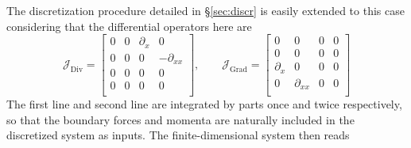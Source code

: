 \documentclass{svjour3}                     %
\newcommand{\secref}[1]{\S\ref{#1}}
\DeclareMathOperator*{\Grad}{Grad}
\DeclareMathOperator*{\Div}{Div}
\begin{document}
The discretization procedure detailed in \secref{sec:discr} is easily extended to this case considering that the differential operators here are 
\[
\bm{\mathcal{J}}_{\Div} = \begin{bmatrix}
0 & 0 & \partial_x & 0 \\
0 & 0 & 0 & -\partial_{xx} \\
0 & 0 & 0 & 0 \\
0 & 0 & 0 & 0 \\
\end{bmatrix}, \qquad 
\bm{\mathcal{J}}_{\Grad} = \begin{bmatrix}
0 & 0 & 0 & 0 \\
0 & 0 & 0 & 0 \\
\partial_x & 0 & 0 & 0 \\
0 & \partial_{xx} & 0 & 0 \\
\end{bmatrix}
\]
The first line and second line are integrated by parts once and twice respectively, so that the boundary forces and momenta are naturally included in the discretized system as inputs. The finite-dimensional system then reads
\end{document}
